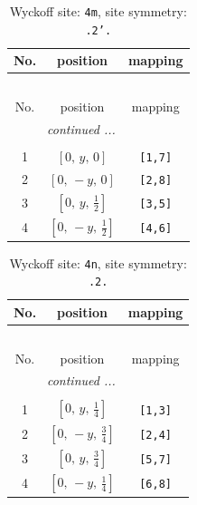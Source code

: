 \documentclass[fleqn,8pt]{jsarticle}
\begin{document}
\renewcommand{\arraystretch}{1.2}
\begin{longtable}{ccc}
\caption{Wyckoff site: {\tt 4m}, site symmetry: {\tt .2'.}}
 \\
 \hline \hline
No. & position & mapping \\ \hline \endfirsthead

\multicolumn{2}{l}{\tablename\ \thetable{}} \\
 \hline \hline
No. & position & mapping \\ \hline \endhead

 \hline \hline
\multicolumn{2}{r}{\footnotesize\it continued ...} \\ \endfoot

 \hline \hline
\multicolumn{2}{r}{} \\ \endlastfoot

1 & $\left[ 0,\, y,\, 0 \right]$ & {\tt [1,7]} \\ \hline
2 & $\left[ 0,\, - y,\, 0 \right]$ & {\tt [2,8]} \\ \hline
3 & $\left[ 0,\, y,\, \frac{1}{2} \right]$ & {\tt [3,5]} \\ \hline
4 & $\left[ 0,\, - y,\, \frac{1}{2} \right]$ & {\tt [4,6]} \\
\end{longtable}
\renewcommand{\arraystretch}{1.2}
\begin{longtable}{ccc}
\caption{Wyckoff site: {\tt 4n}, site symmetry: {\tt .2.}}
 \\
 \hline \hline
No. & position & mapping \\ \hline \endfirsthead

\multicolumn{2}{l}{\tablename\ \thetable{}} \\
 \hline \hline
No. & position & mapping \\ \hline \endhead

 \hline \hline
\multicolumn{2}{r}{\footnotesize\it continued ...} \\ \endfoot

 \hline \hline
\multicolumn{2}{r}{} \\ \endlastfoot

1 & $\left[ 0,\, y,\, \frac{1}{4} \right]$ & {\tt [1,3]} \\ \hline
2 & $\left[ 0,\, - y,\, \frac{3}{4} \right]$ & {\tt [2,4]} \\ \hline
3 & $\left[ 0,\, y,\, \frac{3}{4} \right]$ & {\tt [5,7]} \\ \hline
4 & $\left[ 0,\, - y,\, \frac{1}{4} \right]$ & {\tt [6,8]} \\
\end{longtable}
\end{document}
